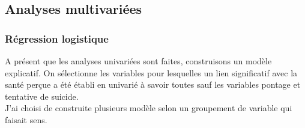\documentclass{book}
\begin{document}
\subsection{Analyses multivariées}
\subsubsection{Régression logistique}

\noindent
A présent que les analyses univariées sont faites, construisons un modèle explicatif. On sélectionne les variables pour lesquelles un lien significatif avec la santé perçue a été établi en univarié à savoir toutes sauf les variables pontage et tentative de suicide.\\

\bigskip
\noindent
J'ai choisi de construite plusieurs modèle selon un groupement de variable qui faisait sens.\\
\end{document}
